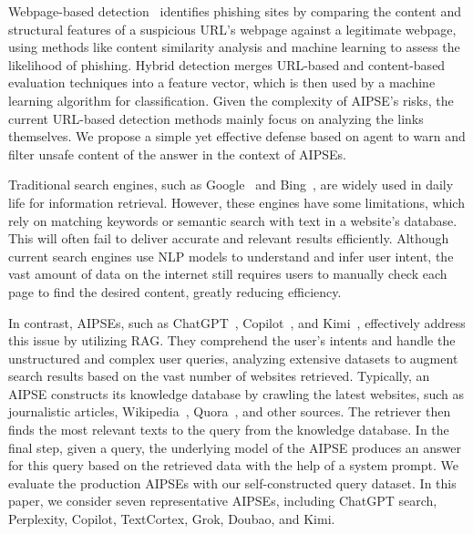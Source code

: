 Webpage-based detection~\cite{web1,web2,web3,web4} identifies phishing sites by comparing the content and structural features of a suspicious URL's webpage against a legitimate webpage, using methods like content similarity analysis and machine learning to assess the likelihood of phishing.
Hybrid detection merges URL-based and content-based evaluation techniques into a feature vector, which is then used by a machine learning algorithm for classification.
Given the complexity of AIPSE's risks, the current URL-based detection methods mainly focus on analyzing the links themselves.
We propose a simple yet effective defense based on agent to warn and filter unsafe content of the answer in the context of AIPSEs.

Traditional search engines, such as Google~\cite{google} and Bing~\cite{bing}, are widely used in daily life for information retrieval.
However, these engines have some limitations, which rely on matching keywords or semantic search with text in a website’s database.
This will often fail to deliver accurate and relevant results efficiently.
Although current search engines use NLP models to understand and infer user intent, the vast amount of data on the internet still requires users to manually check each page to find the desired content, greatly reducing efficiency.

In contrast, AIPSEs, such as ChatGPT~\cite{openai_chatgpt}, Copilot~\cite{microsoft_copilot}, and Kimi~\cite{moonshot_kimi}, effectively address this issue by utilizing RAG.
They comprehend the user's intents and handle the unstructured and complex user queries, analyzing extensive datasets to augment search results based on the vast number of websites retrieved.
Typically, an AIPSE constructs its knowledge database by crawling the latest websites, such as journalistic articles, Wikipedia~\cite{Wikipedia}, Quora~\cite{Quora}, and other sources.
The retriever then finds the most relevant texts to the query from the knowledge database.
In the final step, given a query, the underlying model of the AIPSE produces an answer for this query based on the retrieved data with the help of a system prompt.
We evaluate the production AIPSEs with our self-constructed query dataset.
In this paper, we consider seven representative AIPSEs, including ChatGPT search, Perplexity, Copilot, TextCortex, Grok, Doubao, and Kimi.

